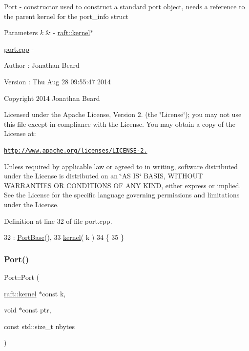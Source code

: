 \hyperlink{class_port}{Port} -\/ constructor used to construct a standard port object, needs a reference to the parent kernel for the port\+\_\+info struct 
\begin{DoxyParams}{Parameters}
{\em k} & -\/ \hyperlink{classraft_1_1kernel}{raft\+::kernel}$\ast$\\
\hline
\end{DoxyParams}
\hyperlink{port_8cpp_source}{port.\+cpp} -\/ \begin{DoxyAuthor}{Author}
\+: Jonathan Beard 
\end{DoxyAuthor}
\begin{DoxyVersion}{Version}
\+: Thu Aug 28 09\+:55\+:47 2014
\end{DoxyVersion}
Copyright 2014 Jonathan Beard

Licensed under the Apache License, Version 2. (the \char`\"{}\+License\char`\"{}); you may not use this file except in compliance with the License. You may obtain a copy of the License at\+:

\href{http://www.apache.org/licenses/LICENSE-2.0}{\tt http\+://www.\+apache.\+org/licenses/\+L\+I\+C\+E\+N\+S\+E-\/2.}

Unless required by applicable law or agreed to in writing, software distributed under the License is distributed on an \char`\"{}\+A\+S I\+S\char`\"{} B\+A\+S\+IS, W\+I\+T\+H\+O\+UT W\+A\+R\+R\+A\+N\+T\+I\+ES OR C\+O\+N\+D\+I\+T\+I\+O\+NS OF A\+NY K\+I\+ND, either express or implied. See the License for the specific language governing permissions and limitations under the License. 

Definition at line 32 of file port.\+cpp.


\begin{DoxyCode}
32                                  : \hyperlink{class_port_base}{PortBase}(),
33                                        \hyperlink{class_port_ac17060db235459adaab87cdccb605884}{kernel}( k )
34 \{
35 \}
\end{DoxyCode}
\hypertarget{class_port_a18a11e3dd9478f802461f857d442cefe}{}\label{class_port_a18a11e3dd9478f802461f857d442cefe} 
\subsubsection{\texorpdfstring{Port()}{Port()}\hspace{0.1cm}{\footnotesize\ttfamily [2/2]}}
{\footnotesize\ttfamily Port\+::\+Port (\begin{DoxyParamCaption}\item[{\hyperlink{classraft_1_1kernel}{raft\+::kernel} $\ast$const}]{k,  }\item[{void $\ast$const}]{ptr,  }\item[{const std\+::size\+\_\+t}]{nbytes }\end{DoxyParamCaption})}

